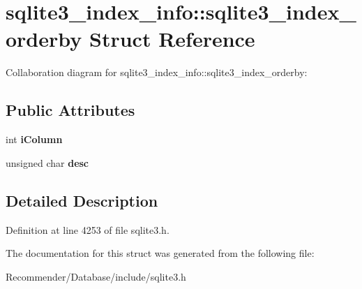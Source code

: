 \section{sqlite3\_\-index\_\-info::sqlite3\_\-index\_\-orderby Struct Reference}
\label{structsqlite3__index__info_1_1sqlite3__index__orderby}
Collaboration diagram for sqlite3\_\-index\_\-info::sqlite3\_\-index\_\-orderby:\subsection*{Public Attributes}
\begin{CompactItemize}
\item 
int {\bf iColumn}\label{structsqlite3__index__info_1_1sqlite3__index__orderby_64afc1df38f1cd02b956e9dd963c0b97}

\item 
unsigned char {\bf desc}\label{structsqlite3__index__info_1_1sqlite3__index__orderby_be5b6d2544ee9433489c61140bb1a77b}

\end{CompactItemize}


\subsection{Detailed Description}




Definition at line 4253 of file sqlite3.h.

The documentation for this struct was generated from the following file:\begin{CompactItemize}
\item 
Recommender/Database/include/sqlite3.h\end{CompactItemize}
